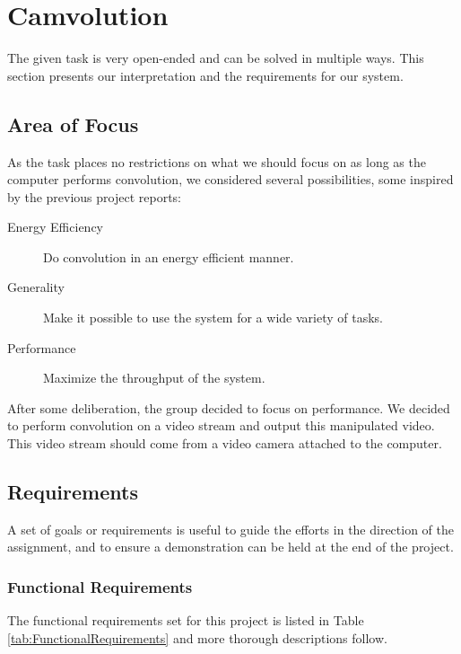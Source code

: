 \section{Camvolution}
The given task is very open-ended and can be solved in multiple ways.
This section presents our interpretation and the requirements for our system.

\subsection{Area of Focus}
As the task places no restrictions on what we should focus on as long as the computer performs convolution, we considered several possibilities, some inspired by the previous project reports:

\begin{description}
    \item[Energy Efficiency] Do convolution in an energy efficient manner.
    \item[Generality] Make it possible to use the system for a wide variety of tasks.
    \item[Performance] Maximize the throughput of the system.
\end{description}

After some deliberation,
the group decided to focus on performance.
We decided to perform convolution on a video stream and output this manipulated video.
This video stream should come from a video camera attached to the computer.

\subsection{Requirements}
A set of goals or requirements is useful to guide the efforts in the direction of the assignment, and to ensure a demonstration can be held at the end of the project.

\subsubsection{Functional Requirements}
The functional requirements set for this project is listed in Table \ref{tab:FunctionalRequirements} and more thorough descriptions follow.

